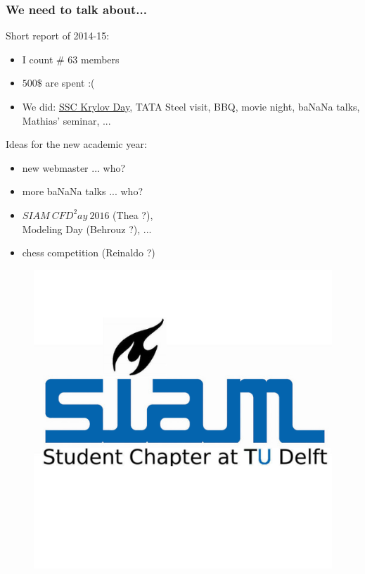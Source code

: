 \documentclass{beamer}
\begin{document}
\begin{frame}
\frametitle{We need to talk about...}
\vspace{0.5cm}
Short report of 2014-15:
\begin{itemize}
 \item I count \# 63 members
 \item $500 \$$ are spent :(
 \item We did: \href{http://sinews.siam.org/DetailsPage/tabid/607/ArticleID/504/European-Students-Gather-at-TU-Delft-for-Krylov-Day.aspx}{SSC Krylov Day}, TATA Steel visit, BBQ, movie night, baNaNa talks, Mathias' seminar, ...
\end{itemize}

Ideas for the new academic year:
\begin{itemize}
 \item new webmaster ... who{\color{red}?}
 \item more baNaNa talks ... who{\color{red}?}
 \item $SIAM \ CFD^2ay \ 2016$ (Thea {\color{red}?}), \\ Modeling Day (Behrouz {\color{red}?}), ...
 \item chess competition (Reinaldo {\color{red}?})
\end{itemize}
 \vspace{-3cm}
 \begin{figure}
 \hfill
 \includegraphics[height=0.3\textheight]{images/SIAMSC_Delft}
\end{figure}
\end{frame}
\end{document}
